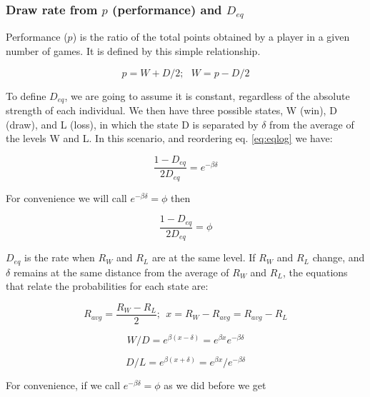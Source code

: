 \documentclass[12pt]{article}
\begin{document}
\subsubsection*{Draw rate from $p$ (performance) and $D_{eq}$}

Performance ($p$) is the ratio of the total points obtained by a player in a given number of games. 
It is defined by this simple relationship.

	\begin{equation} \label{eq:deq_perf}
	p = W + D/2;\:\:\: W = p - D/2
	\end{equation}

To define $D_{eq}$, we are going to assume it is constant, regardless of the absolute strength of each individual.
We then have three possible states, W (win), D (draw), and L (loss), in which the state D is separated by $\delta$ from the average of the levels W and L.
In this scenario, and reordering eq. \ref{eq:eqlog} we have:

	\begin{equation} \label{eq:deq0}
	\frac{1-D_{eq}}{2 D_{eq}} = e^{-\beta \delta}
	\end{equation}

For convenience we will call $e^{-\beta \delta} = \phi$ then

	\begin{equation} \label{eq:deq0b}
	\frac{1-D_{eq}}{2 D_{eq}} = \phi
	\end{equation}

$D_{eq}$ is the rate when $R_{W}$ and $R_{L}$ are at the same level. 
If $R_{W}$ and $R_{L}$ change, and $\delta$ remains at the same distance from the average of $R_{W}$ and $R_{L}$, the equations that relate the probabilities for each state are:

	\begin{equation} \label{eq:deq1}
	R_{avg} = \frac{R_{W} - R_{L}}{2};\:\: x = R_{W} - R_{avg} =  R_{avg} - R_{L}
	\end{equation}

	\begin{equation} \label{eq:deq2}
	W/D = e^{\beta(x-\delta)} =  e^{\beta x} e^{-\beta \delta}
	\end{equation}

	\begin{equation} \label{eq:deq3}
	D/L = e^{\beta(x+\delta)} =  e^{\beta x} / e^{-\beta \delta}
	\end{equation}


For convenience, if we call $e^{-\beta \delta} = \phi$ as we did before we get
\end{document}
